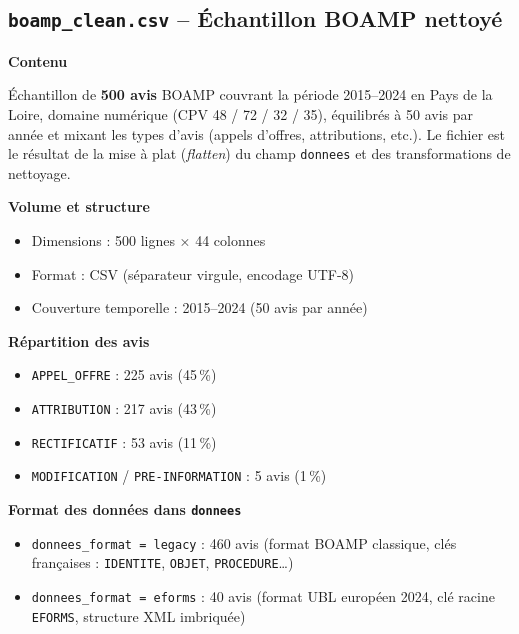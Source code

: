 \documentclass[12pt,a4paper]{article}
\begin{document}
\subsection{\texttt{boamp\_clean.csv} -- Échantillon BOAMP nettoyé}

\textbf{Contenu}

Échantillon de \textbf{500 avis} BOAMP couvrant la période 2015--2024 en Pays
de la Loire, domaine numérique (CPV 48 / 72 / 32 / 35), équilibrés à 50 avis
par année et mixant les types d'avis (appels d'offres, attributions, etc.).
Le fichier est le résultat de la mise à plat (\textit{flatten}) du champ
\texttt{donnees} et des transformations de nettoyage.

\medskip
\textbf{Volume et structure}

\begin{itemize}
  \item[---] Dimensions : 500 lignes × 44 colonnes
  \item[---] Format : CSV (séparateur virgule, encodage UTF-8)
  \item[---] Couverture temporelle : 2015--2024 (50 avis par année)
\end{itemize}

\medskip
\textbf{Répartition des avis}

\begin{itemize}
  \item[---] \texttt{APPEL\_OFFRE} : 225 avis (45\,\%)
  \item[---] \texttt{ATTRIBUTION} : 217 avis (43\,\%)
  \item[---] \texttt{RECTIFICATIF} : 53 avis (11\,\%)
  \item[---] \texttt{MODIFICATION} / \texttt{PRE-INFORMATION} : 5 avis (1\,\%)
\end{itemize}

\medskip
\textbf{Format des données dans \texttt{donnees}}

\begin{itemize}
  \item[---] \texttt{donnees\_format = legacy} : 460 avis (format BOAMP
    classique, clés françaises : \texttt{IDENTITE}, \texttt{OBJET},
    \texttt{PROCEDURE}\ldots)
  \item[---] \texttt{donnees\_format = eforms} : 40 avis (format UBL européen
    2024, clé racine \texttt{EFORMS}, structure XML imbriquée)
\end{itemize}
\end{document}
